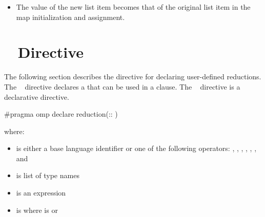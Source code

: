 \begin{samepage}
\fortranspecificstart
\begin{itemize}
\item The value of the new list item becomes that of the original list item in the map 
initialization and assignment.
\fortranspecificend
\end{itemize}
\end{samepage}









\section{~ Directive}
\label{sec:declare reduction Directive}
\summary
The following section describes the directive for declaring user-defined reductions. The 
~ directive declares a  that can be used in a 
 clause. The ~ directive is a declarative directive.

\syntax
\cspecificstart
\begin{boxedcode}
\#pragma omp declare reduction(:: 
)
\end{boxedcode}

where:

\begin{itemize}

\item {} is either a base language identifier or one of the following 
operators: 
\code{+}, 
\code{-}, 
\code{*}, 
\code{\&}, 
\code{|}, 
\code{\^}, 
\code{\&\&} and 
\code{||} 

\item {} is list of type names 

\item {} is an expression 

\item {} is \code{)}
where  is\linebreak
{} or \code{(}\code{)} 
\end{itemize}
\cspecificend


